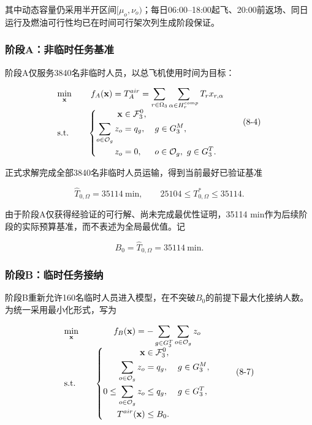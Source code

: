 其中动态容量仍采用半开区间$[\mu_o,\nu_o)$；每日06:00--18:00起飞、20:00前返场、同日运行及燃油可行性均已在时间可行架次列生成阶段保证。

\subsubsection{阶段A：非临时任务基准}

阶段A仅服务3840名非临时人员，以总飞机使用时间为目标：

\[
\begin{array}{@{}l@{\qquad}c@{}}
\displaystyle \min_{\mathbf{x}}
&
\displaystyle
f_A(\mathbf{x})
=
T_A^{air}
=
\sum_{r\in\Omega_3}\sum_{\alpha\in H_r^{comp}}T_rx_{r,\alpha}
\\[1.0em]
\mathrm{s.t.}
&
\left\{
\begin{aligned}
\mathbf{x}&\in\mathcal F_3^0,\\
\sum_{o\in\mathcal O_g}z_o&=q_g,
&&g\in G_3^M,\\
z_o&=0,
&&o\in\mathcal O_g,\ g\in G_3^T.
\end{aligned}
\right.
\end{array}
\tag{8-4}\label{eq:q3-stage-a}
\]

正式求解完成全部3840名非临时人员运输，得到当前最好已验证基准

\[
\widehat T_{0,\Omega}=35114\ \mathrm{min},
\qquad
25104\le T_{0,\Omega}^{*}\le35114.
\tag{8-5}\label{eq:q3-stage-a-bound}
\]

由于阶段A仅获得经验证的可行解、尚未完成最优性证明，35114 min作为后续阶段的实际预算基准，而不表述为全局最优值。记

\[
B_0=\widehat T_{0,\Omega}=35114\ \mathrm{min}.
\tag{8-6}\label{eq:q3-budget}
\]

\subsubsection{阶段B：临时任务接纳}

阶段B重新允许160名临时人员进入模型，在不突破$B_0$的前提下最大化接纳人数。为统一采用最小化形式，写为

\[
\begin{array}{@{}l@{\qquad}c@{}}
\displaystyle \min_{\mathbf{x}}
&
\displaystyle
f_B(\mathbf{x})
=
-\sum_{g\in G_3^T}\sum_{o\in\mathcal O_g}z_o
\\[1.0em]
\mathrm{s.t.}
&
\left\{
\begin{aligned}
\mathbf{x}&\in\mathcal F_3^0,\\
\sum_{o\in\mathcal O_g}z_o&=q_g,
&&g\in G_3^M,\\
0\le\sum_{o\in\mathcal O_g}z_o&\le q_g,
&&g\in G_3^T,\\
T^{air}(\mathbf{x})&\le B_0.
\end{aligned}
\right.
\end{array}
\tag{8-7}\label{eq:q3-stage-b}
\]

